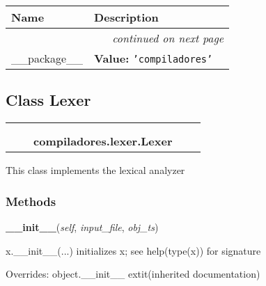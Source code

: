     \vspace{-1cm}
\hspace{\varindent}\begin{longtable}{|p{\varnamewidth}|p{\vardescrwidth}|l}
\cline{1-2}
\cline{1-2} \centering \textbf{Name} & \centering \textbf{Description}& \\
\cline{1-2}
\endhead\cline{1-2}\multicolumn{3}{r}{\small\textit{continued on next page}}\\\endfoot\cline{1-2}
\endlastfoot\raggedright \_\-\_\-p\-a\-c\-k\-a\-g\-e\-\_\-\_\- & \raggedright \textbf{Value:} 
{\tt \texttt{'}\texttt{compiladores}\texttt{'}}&\\
\cline{1-2}
\end{longtable}



\subsection{Class Lexer}

    \label{compiladores:lexer:Lexer}
\begin{tabular}{cccccc}
\multicolumn{2}{r}{\settowidth{\BCL}{object}\multirow{2}{\BCL}{object}}
&&
  \\\cline{3-3}
  &&\multicolumn{1}{c|}{}
&&
  \\
&&\multicolumn{2}{l}{\textbf{compiladores.lexer.Lexer}}
\end{tabular}

This class implements the lexical analyzer



  \subsubsection{Methods}

    \vspace{0.5ex}

\hspace{.8\funcindent}\begin{boxedminipage}{\funcwidth}

    \raggedright \textbf{\_\_init\_\_}(\textit{self}, \textit{input\_file}, \textit{obj\_ts})

\setlength{\parskip}{2ex}
    x.\_\_init\_\_(...) initializes x; see help(type(x)) for signature

\setlength{\parskip}{1ex}
      Overrides: object.\_\_init\_\_ 	extit{(inherited documentation)}

    \end{boxedminipage}

